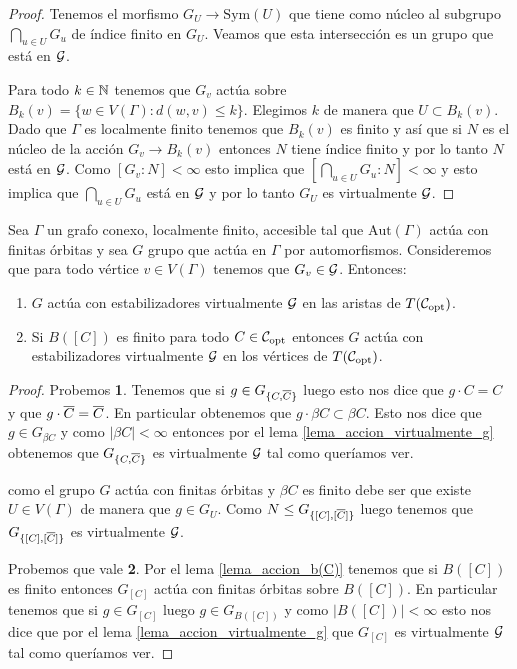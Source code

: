 \documentclass[tesis.tex]{subfiles}
\newcommand{\aut}{\text{Aut}}
\newcommand{\Sy}{\text{Sym}}
\begin{document}
\begin{proof}
	Tenemos el morfismo $G_{U} \to \Sy(U)$ que tiene como núcleo al subgrupo $\bigcap_{u \in U} G_u$ de índice finito en $G_U$.
	Veamos que esta intersección es un grupo que está en ${\cal G}$.
	
	Para todo $k \in \mathbb{N}$ tenemos que $G_{v}$ actúa sobre $B_{k}(v) = \{ w \in V(\Gamma) : d(w,v) \le k  \}$.
	Elegimos $k$ de manera que ${ U} \subset B_{k}(v)$.
	Dado que $\Gamma$ es localmente finito tenemos que $B_{k}(v)$ es finito y así que si $N$ es el núcleo de la acción $G_{v} \to B_{k}(v)$ entonces $N$ tiene índice finito y por lo tanto $N$ está en ${\cal G}$.
	Como $[G_{v} : N] < \infty$ esto implica que $ [\bigcap_{u \in U} G_{u} : N] < \infty$
	y esto implica que $ \bigcap_{u \in U} G_{u}$ está en ${\cal G}$ y por lo tanto $G_{ U}$ es virtualmente ${\cal G}$.
\end{proof}


\begin{prop}\label{prop_clase_grupos_accion}
	Sea $\Gamma$ un grafo conexo, localmente finito, accesible tal que $\aut(\Gamma)$ actúa con finitas órbitas y sea $G$ grupo que actúa en $\Gamma$ por automorfismos.
	Consideremos que para todo vértice $v \in V(\Gamma)$ tenemos que $G_{v} \in {\cal G}$.
	Entonces:
	\begin{enumerate}
		\item $G$ actúa con estabilizadores virtualmente ${\cal G}$ en las aristas de $T({\cal C}_{\text{opt}})$.
		\item Si $B([C])$ es finito para todo $C \in {\cal C}_{\text{opt}}$ entonces $G$ actúa con estabilizadores virtualmente ${\cal G}$ en los vértices de $T({\cal C}_{\text{opt}})$.
	\end{enumerate}	
\end{prop}

\begin{proof}
	Probemos \textbf{1}.
	Tenemos que si $g \in G_{\{C,\overline C\}}$ luego esto nos dice que $g \cdot C = C $ y que $g \cdot \overline C = \overline C$. 
	En particular obtenemos que $g \cdot \beta C \subset \beta C$.
	Esto nos dice que $g \in G_{\beta C}$ y como $|\beta C| < \infty$ entonces por el lema \ref{lema_accion_virtualmente_g} obtenemos que $G_{\{C,\overline C\}}$ es virtualmente ${\cal G}$ tal como queríamos ver.
	
	como el grupo $G$ actúa con finitas órbitas y $\beta C$ es finito debe ser que existe $U \in V(\Gamma)$ de manera que $g \in G_{U}$.
	Como $N \le G_{\{[C],[\overline C]\}}$ luego tenemos que $G_{\{[C],[\overline C]\}}$ es virtualmente ${\cal G}$.
	
	Probemos que vale \textbf{2}.
	Por el lema \ref{lema_accion_b(C)} tenemos que si $B([C])$ es finito entonces $G_{[C]}$ actúa con finitas órbitas sobre $B([C])$.
	En particular tenemos que si $g \in G_{[C]}$ luego $g \in G_{B([C])}$ y como $|B([C])| < \infty$ esto nos dice que por el lema \ref{lema_accion_virtualmente_g} que $G_{[C]}$ es virtualmente ${\cal G}$ tal como queríamos ver.
	
\end{proof}
\end{document}
